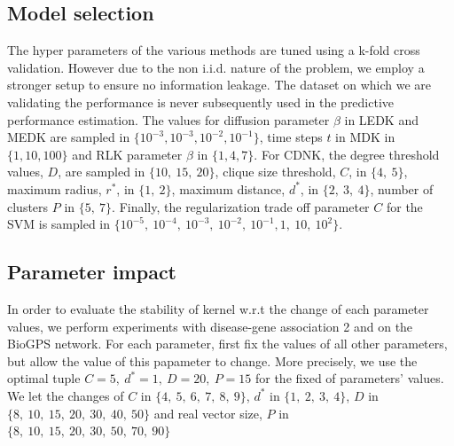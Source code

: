 \documentclass[review]{elsarticle}
\begin{document}
\subsection{Model selection}
The hyper parameters of the various methods are tuned using a k-fold cross validation. However due to the non i.i.d. nature of the problem, we employ a stronger setup to ensure no information leakage. The dataset on which we are validating the performance is never subsequently used in the predictive performance estimation. The values for diffusion parameter $\beta$ in LEDK and MEDK are sampled in $\lbrace 10^{-3}, 10^{-3}, 10^{-2}, 10^{-1} \rbrace$, time steps $t$ in MDK in $\lbrace 1, 10, 100 \rbrace$ and RLK parameter $\beta$ in $\lbrace 1, 4, 7 \rbrace$. For CDNK, the degree threshold values, $D$, are sampled in $\lbrace 10,\ 15,\ 20 \rbrace$, clique size threshold, $C$, in $\lbrace 4,\ 5 \rbrace$, maximum radius, $r^*$, in $\lbrace 1,\ 2 \rbrace$, maximum distance, $d^*$, in $\lbrace 2,\ 3,\ 4 \rbrace$, number of clusters $P$ in $\lbrace 5,\ 7 \rbrace$. Finally, the regularization trade off parameter $C$ for the SVM is sampled in $\lbrace 10^{-5},  \ 10^{-4}, \ 10^{-3},\ 10^{-2},\ 10^{-1}, 1,\ 10,\ 10^2 \rbrace$.

\subsection{Parameter impact}
In order to evaluate the stability of kernel w.r.t the change of each parameter values, we perform experiments with disease-gene association 2 and on the BioGPS network. For each parameter, first fix the values of all other parameters, but allow the value of this papameter to change. More precisely, we use the optimal tuple $C = 5,\ d^* = 1,\ D = 20,\ P = 15$ for the fixed of parameters' values. We let the changes of $C$ in $\lbrace 4,\ 5,\ 6,\ 7,\ 8,\ 9\rbrace$, $d^*$ in $\lbrace 1,\ 2,\ 3,\ 4\rbrace$, $D$ in $\lbrace 8,\ 10,\ 15,\ 20,\ 30,\ 40,\ 50\rbrace$ and real vector size, $P$ in $\lbrace 8,\ 10,\ 15,\ 20,\ 30,\ 50,\ 70,\ 90\rbrace$
\end{document}
